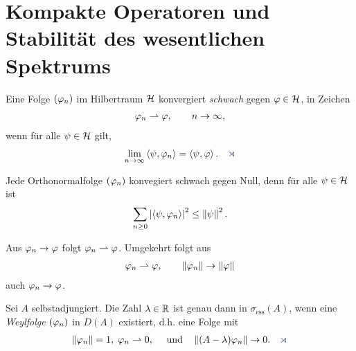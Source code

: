 \chapter{Kompakte Operatoren und Stabilität des wesentlichen Spektrums}

\begin{defn*}
Eine Folge $(\varphi_n)$ im Hilbertraum $\mathcal{H}$ konvergiert
\emph{schwach} gegen $\varphi\in \mathcal{H}$, in Zeichen
\begin{align*}
\varphi_n \rightharpoonup \varphi,\qquad n\to \infty,
\end{align*}
wenn für alle $\psi\in\mathcal{H}$ gilt,
\begin{align*}
\lim\limits_{n\to\infty} \lin{\psi,\ph_n} = \lin{\psi,\ph}.\fishhere
\end{align*}
\end{defn*}

\begin{bem*}[Bemerkungen.]
\begin{bemenum}
\item Jede Orthonormalfolge $(\varphi_n)$ konvegiert schwach gegen Null, denn für
alle $\psi\in\mathcal{H}$ ist
\begin{align*}
\sum_{n\ge 0} \left|\left\langle\psi,\varphi_n\right\rangle\right|^2 \le \left\|\psi\right\|^2.
\end{align*}
\item Aus $\varphi_n\to \varphi$ folgt $\varphi_n\rightharpoonup \varphi$. Umgekehrt folgt aus
\begin{align*}
\varphi_n\rightharpoonup \varphi,\qquad \left\|\varphi_n\right\|\to \left\|\varphi\right\|
\end{align*}
auch $\varphi_n \to\varphi$.\maphere
\end{bemenum}
\end{bem*}

\begin{thm}
\label{prop:7.1}
Sei $A$ selbstadjungiert. Die Zahl $\lambda\in\mathbb{R}$ ist genau dann in
$\sigma_\mathrm{ess}(A)$, wenn eine \emph{Weylfolge} $(\varphi_n)$ in $D(A)$
existiert, d.h. eine Folge mit 
\begin{align*}
\norm{\ph_n} =1,\; \ph_n\wto 0,\quad \text{ und}\quad
\norm{(A-\lambda)\ph_n}\to 0.\fishhere
\end{align*}
\end{thm}

